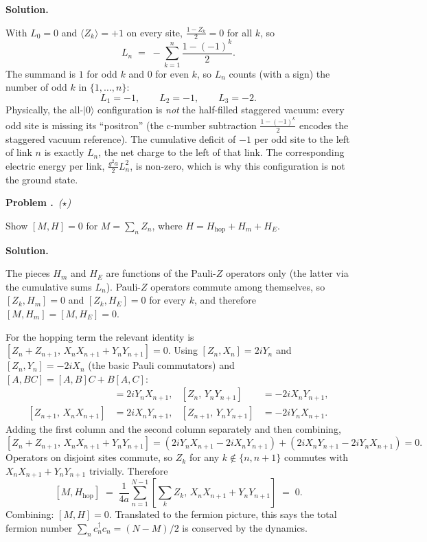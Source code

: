 \documentclass[11pt,a4paper]{article}
\newcounter{problem}
\newenvironment{problem}[1][]{%
  \refstepcounter{problem}%
  \par\medskip\noindent
  \textbf{Problem \theproblem.}\if\relax\detokenize{#1}\relax\else\ \textit{(#1)}\fi\quad\ignorespaces
}{\par\smallskip}
\newenvironment{solution}{%
  \par\noindent\textbf{Solution.}\quad\ignorespaces
}{\par\medskip}
\newcommand{\ket}[1]{\lvert #1 \rangle}
\begin{document}
\begin{solution}
With $L_0 = 0$ and $\langle Z_k \rangle = +1$ on every site,
$\tfrac{1 - Z_k}{2} = 0$ for all $k$, so
\[
  L_n \;=\; -\sum_{k=1}^{n} \frac{1 - (-1)^k}{2}.
\]
The summand is $1$ for odd $k$ and $0$ for even $k$, so $L_n$ counts
(with a sign) the number of odd $k$ in $\{1, \ldots, n\}$:
\[
  L_1 = -1,\qquad L_2 = -1,\qquad L_3 = -2.
\]
Physically, the all-$\ket 0$ configuration is \emph{not} the
half-filled staggered vacuum: every odd site is missing its
``positron'' (the c-number subtraction $\tfrac{1 - (-1)^k}{2}$
encodes the staggered vacuum reference).  The cumulative deficit
of $-1$ per odd site to the left of link $n$ is exactly $L_n$, the
net charge to the left of that link.  The corresponding electric
energy per link, $\tfrac{g^2 a}{2} L_n^2$, is non-zero, which is why
this configuration is not the ground state.
\end{solution}

\begin{problem}[$\star$]
Show $[M, H] = 0$ for $M = \sum_n Z_n$, where $H = H_{\mathrm{hop}} + H_m + H_E$.
\end{problem}

\begin{solution}
The pieces $H_m$ and $H_E$ are functions of the Pauli-$Z$ operators
only (the latter via the cumulative sums $L_n$).  Pauli-$Z$ operators
commute among themselves, so
$[Z_k, H_m] = 0$ and $[Z_k, H_E] = 0$ for every $k$, and therefore
$[M, H_m] = [M, H_E] = 0$.

For the hopping term the relevant identity is
$[Z_n + Z_{n+1},\, X_n X_{n+1} + Y_n Y_{n+1}] = 0$.  Using
$[Z_n, X_n] = 2iY_n$ and $[Z_n, Y_n] = -2i X_n$ (the basic
Pauli commutators) and $[A, BC] = [A, B]C + B[A, C]$:
\begin{align*}
  [Z_n,\, X_n X_{n+1}] &= 2iY_n X_{n+1}, &
  [Z_n,\, Y_n Y_{n+1}] &= -2i X_n Y_{n+1},\\
  [Z_{n+1},\, X_n X_{n+1}] &= 2i X_n Y_{n+1}, &
  [Z_{n+1},\, Y_n Y_{n+1}] &= -2i Y_n X_{n+1}.
\end{align*}
Adding the first column and the second column separately and then
combining,
\[
  [Z_n + Z_{n+1},\, X_n X_{n+1} + Y_n Y_{n+1}]
  = (2iY_n X_{n+1} - 2i X_n Y_{n+1}) + (2i X_n Y_{n+1} - 2i Y_n X_{n+1})
  = 0.
\]
Operators on disjoint sites commute, so $Z_k$ for any $k \notin \{n, n+1\}$
commutes with $X_n X_{n+1} + Y_n Y_{n+1}$ trivially.  Therefore
\[
  [M, H_{\mathrm{hop}}]
  \;=\; \frac{1}{4a}\sum_{n=1}^{N-1}
    [\sum_k Z_k,\, X_n X_{n+1} + Y_n Y_{n+1}]
  \;=\; 0.
\]
Combining: $[M, H] = 0$.  Translated to the fermion picture, this
says the total fermion number $\sum_n c^\dagger_n c_n = (N - M)/2$ is
conserved by the dynamics.
\end{solution}
\end{document}
